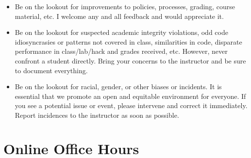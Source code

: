 \documentclass[12pt]{scrartcl}
\begin{document}
\begin{itemize}
  \item Be on the lookout for improvements to policies, processes, 
    grading, course material, etc.  I welcome any and all feedback and would
    appreciate it.
  \item Be on the lookout for suspected academic integrity violations, odd
    code idiosyncrasies or patterns not covered in class, similarities in code, 
    disparate performance in class/lab/hack and grades received, etc.  However,
    never confront a student directly.  Bring your concerns to the instructor and
    be sure to document everything.
  \item Be on the lookout for racial, gender, or other biases or incidents.  
    It is essential that we promote an open and equitable environment for everyone.
    If you see a potential issue or event, please intervene and correct it immediately.
    Report incidences to the instructor as soon as possible.  
\end{itemize}

\section*{Online Office Hours}
\end{document}
